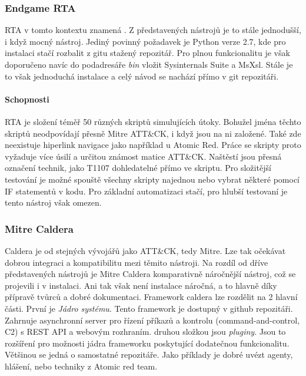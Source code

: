 
\subsubsection{Endgame RTA}
\ac{RTA} v tomto kontextu znamená .
Z představených nástrojů je to stále jednodušší, i když mocný nástroj.
Jediný povinný požadavek je Python verze 2.7, kde pro instalaci stačí rozbalit z gitu stažený repozitář.
Pro plnou funkcionalitu je však doporučeno navíc do podadresáře \textit{bin} vložit Sysinternals Suite a MsXsl.
Stále je to však jednoduchá instalace a celý návod se nachází přímo v git repozitáři.\cite{endgame_rta}

\paragraph{Schopnosti}
\ac{RTA} je složení téměř 50 různých skriptů simulujících útoky.
Bohužel jména těchto skriptů neodpovídají přesně Mitre ATT\&CK, i když jsou na ni založené.
Také zde neexistuje hiperlink navigace jako například u Atomic Red.
Práce se skripty proto vyžaduje více úsilí a určitou známost matice ATT\&CK\@.
Naštěstí jsou přesná označení technik, jako T1107 dohledatelné přímo ve skriptu.
Pro složitější testování je možné spouště všechny skripty najednou nebo vybrat některé pomocí IF statementů v kodu.
Pro základní automatizaci stačí, pro hlubší testovaní je tento nástroj však omezen.\cite{csoonline_4_testing_frameworks}



\subsubsection{Mitre Caldera}
Caldera je od stejných vývojářů jako ATT\&CK, tedy Mitre.
Lze tak očekávat dobrou integraci a kompatibilitu mezi těmito nástroji.
Na rozdíl od dříve představených nástrojů je Mitre Caldera komparativně náročnější nástroj, což se projevili i v instalaci.
Ani tak však není instalace náročná, a to hlavně díky přípravě tvůrců a dobré dokumentaci\cite{mitre_caldera_docs}.
Framework caldera lze rozdělit na 2 hlavní části.
První je \textit{Jádro systému}.
Tento framework je dostupný v github repozitáři.
Zahrnuje asynchronní server pro řízení příkazů a kontrolu (command-and-control, C2) s REST API a webovým rozhraním.
druhou složkou jsou \textit{pluginy}.
Jsou to rozšíření pro možnosti jádra frameworku poskytující dodatečnou funkcionalitu.
Většinou se jedná o samostatné repozitáře.
Jako příklady je dobré uvézt agenty, hlášení, nebo  techniky z Atomic red team.\cite{mitre_caldera}

